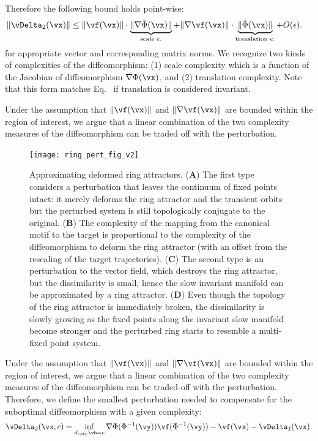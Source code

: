 \documentclass{article}
\theoremstyle{definition} \newtheorem{definition}{Definition}  \newtheorem{example}{Example}
\theoremstyle{remark} \newtheorem{remark}{Remark}
\renewcommand{\eqref}{Eq.~\originaleqref}
\newcounter{ct}
\DeclarePairedDelimiter{\norm}{\lVert}{\rVert}
\newcommand{\inv}{^{-1}}
\newcommand{\dcomplexity}{\ensuremath{d_\text{cxty}}}
\newcommand{\homeo}{\Phi} %
\newcommand{\invhomeo}{\homeo\inv}
\begin{document}
Therefore the following bound holds point-wise:
\begin{align}
    \norm{\vDelta_2(\vx)}
    &\leq
	\norm{\vf(\vx)}
	\cdot
	\underbrace{
	    \norm{\nabla\tilde\homeo(\vx)}
	}_{\substack{\text{scale c.}}}
	+
	\norm{\nabla\vf(\vx)}
	\cdot
	\underbrace{
	\norm{\tilde\homeo(\vx)}
	}_{\substack{\text{translation c.}}}
	+ O(\epsilon).
    \label{eq:h:bound}
\end{align}
for appropriate vector and corresponding matrix norms.
We recognize two kinds of complexities of the diffeomorphism: (1) scale complexity which is a function of the Jacobian of diffeomorphism $\nabla\homeo(\vx)$, and (2) translation complexity.
Note that this form matches \eqref{eq:dcomplexity} if translation is considered invariant.

Under the assumption that $\norm{\vf(\vx)}$ and $\norm{\nabla\vf(\vx)}$ are bounded within the region of interest, we argue that a linear combination of the two complexity measures of the diffeomorphism can be traded off with the perturbation.
\begin{figure}[t!bhp]
    \centering
    \texttt{[image: ring\_pert\_fig\_v2]}
    \caption{Approximating deformed ring attractors. %
    (\textbf{A})  The first type considers a perturbation that leaves the continuum of fixed points intact: it merely deforms the ring attractor and the transient orbits but the perturbed system is still topologically conjugate to the original. 
    (\textbf{B}) The complexity of the mapping from the canonical motif to the target is proportional to the complexity of the diffeomorphism to deform the ring attractor (with an offset from the rescaling of the target trajectories).
    (\textbf{C}) The second type is an perturbation to the vector field, which destroys the ring attractor, but the dissimilarity is small, hence the slow invariant manifold can be approximated by a ring attractor.
    (\textbf{D}) Even though the topology of the ring attractor is immediately broken, the dissimilarity is slowly growing as the fixed points along the invariant slow manifold become stronger and the perturbed ring starts to resemble a multi-fixed point system.
    }
    \label{fig:ring_pert_fig}
\end{figure}

Under the assumption that $\norm{\vf(\vx)}$ and $\norm{\nabla\vf(\vx)}$ are bounded within the region of interest, we argue that a linear combination of the two complexity measures of the diffeomorphism can be traded-off with the perturbation.
Therefore, we define the smallest perturbation needed to compensate for the suboptimal diffeomorphism with a given complexity:
\begin{align}
    \vDelta_2(\vx ; c) = \inf_{\dcomplexity{\vh} = c}
	\nabla\homeo(\invhomeo(\vy)) \vf(\invhomeo(\vy))
	- \vf(\vx) - \vDelta_1(\vx).
\end{align}
\end{document}
